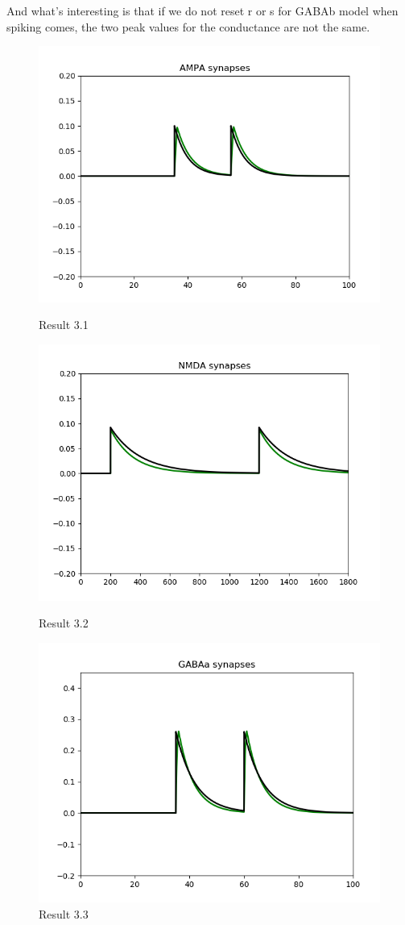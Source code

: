 \documentclass[12pt]{article}
\begin{document}
And what's interesting is that if we do not reset r or s for GABAb model when spiking comes, the two peak values for the conductance are not the same.
 \begin{figure}[H]
  \centering
  \includegraphics[width=.8\textwidth]{h2_p1_AMPA.png} %
  \label{img} %
  \caption{Result 3.1}

\end{figure}
 \begin{figure}[H]
  \centering
    \includegraphics[width=.8\textwidth]{h2_p1_NMDA.png} %
     \caption{Result 3.2}
      \includegraphics[width=.8\textwidth]{h2_p1_GABAa.png} %
  \caption{Result 3.3}

\end{figure}
\end{document}
